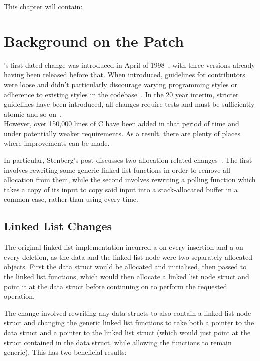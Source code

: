 This chapter will contain:

\section{Background on the Patch}

's first dated change was introduced in April of 1998~\cite{curlrelease}, with three versions already having been released before that. When introduced, guidelines for contributors were loose and didn't particularly discourage varying programming styles or adherence to existing styles in the codebase~\cite{curlcontribute1999}. In the 20 year interim, stricter guidelines have been introduced, all changes require tests and must be sufficiently atomic and so on~\cite{curlcontribute2017}.\\
However, over 150,000 lines of C have been added in that period of time and under potentially weaker requirements. As a result, there are plenty of places where improvements can be made.

In particular, Stenberg's post discusses two allocation related changes~\cite{curlmalloc}. The first involves rewriting some generic linked list functions in order to remove all allocation from them, while the second involves rewriting a polling function which takes a copy of its input to copy said input into a stack-allocated buffer in a common case, rather than using \malloc{} every time.

\subsection{Linked List Changes}

The original linked list implementation incurred a \malloc{} on every insertion and a \free{} on every deletion, as the data and the linked list node were two separately allocated objects. First the data struct would be allocated and initialised, then passed to the linked list functions, which would then allocate a linked list node struct and point it at the data struct before continuing on to perform the requested operation.

The change involved rewriting any data structs to also contain a linked list node struct and changing the generic linked list functions to take both a pointer to the data struct and a pointer to the linked list struct (which would just point at the struct contained in the data struct, while allowing the functions to remain generic). This has two beneficial results:

